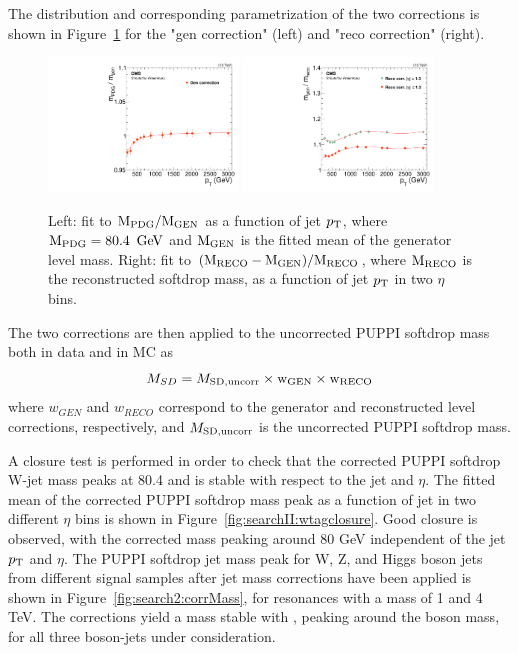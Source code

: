 The distribution and corresponding parametrization of the two corrections is shown in Figure~\ref{fig:jmcfits} for the "gen correction" (left) and "reco correction" (right).
\begin{figure}[h!]
\centering
\includegraphics[width=0.45\textwidth]{figures/analysis/search2/AN-16-235/plots/JMC_fit_gen.pdf}
\includegraphics[width=0.45\textwidth]{figures/analysis/search2/AN-16-235/plots/JMC_fit_reco.pdf}
\caption{Left: fit to $\rm{M_{PDG}/M_{GEN}}$ as a function of jet $p_{\mathrm{T}}$, where $\rm{M_{PDG}}=80.4~\,\text{Ge\hspace{-.08em}V}$ and $\rm{M_{GEN}}$ is the fitted mean of the generator level mass. Right: fit to $\rm{(M_{RECO}-M_{GEN})/M_{RECO}}$, where $\rm{M_{RECO}}$ is the reconstructed softdrop mass, as a function of jet $p_{\mathrm{T}}$ in two $\eta$ bins.}
\label{fig:jmcfits}
\end{figure}
The two corrections are then applied to the uncorrected PUPPI softdrop mass both in data and in MC as
\begin{equation}
M_{SD}=M_{\rm{SD, uncorr}} \times \rm{w_{GEN}} \times \rm{w_{RECO}}
\end{equation}
where $w_{GEN}$ and $w_{RECO}$ correspond to the generator and reconstructed level corrections, respectively, and $M_{\rm{SD, uncorr}}$ is the uncorrected PUPPI softdrop mass. \par
A closure test is performed in order to check that the corrected PUPPI softdrop W-jet mass peaks at 80.4 \GeV and is stable with respect to the jet \PT and $\eta$. The fitted mean of the corrected PUPPI softdrop mass peak as a function of jet \PT in two different $\eta$ bins is shown in Figure~\ref{fig:searchII:wtagclosure}. Good closure is observed, with the corrected mass peaking around 80 GeV independent of the jet $p_{\mathrm{T}}$ and $\eta$. The PUPPI softdrop jet mass peak for W, Z, and Higgs boson jets from different signal samples after jet mass corrections have been applied is shown in Figure~\ref{fig:search2:corrMass}, for resonances with a mass of 1 and 4 TeV. The corrections yield a mass stable with \PT, peaking around the boson mass, for all three boson-jets under consideration. 
